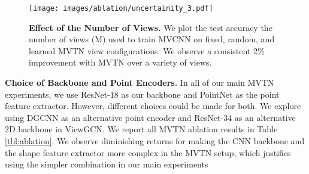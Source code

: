 \documentclass[10pt,twocolumn,letterpaper]{article}
\newcommand{\mysection}[1]{\noindent\textbf{#1.}}
\begin{document}
\begin{figure}[t]
    \centering
    \texttt{[image: images/ablation/uncertainity\_3.pdf]}
    \caption{\textbf{Effect of the Number of Views.} We plot the test accuracy \vs the number of views (M) used to train MVCNN on fixed, random, and learned MVTN view configurations. We observe a consistent 2\% improvement with MVTN over a variety of views.}
    \label{fig:classification}
\end{figure}



\mysection{Choice of Backbone and Point Encoders}
In all of our main MVTN experiments, we use ResNet-18 as our backbone and PointNet as the point feature extractor. However, different choices could be made for both.
We explore using DGCNN \cite{dgcn} as an alternative point encoder and ResNet-34 as an alternative 2D backbone in ViewGCN. We report all MVTN ablation results in Table \ref{tbl:ablation}. We observe diminishing returns for making the CNN backbone and the shape feature extractor more complex in the MVTN setup, which justifies using the simpler combination in our main experiments

\begin{table}[t]
\footnotesize
\setlength{\tabcolsep}{6pt} \renewcommand{\arraystretch}{1.1} \centering
{}
\vspace{2pt}
\caption{\small \textbf{Ablation Study}. We analyze the effect of ablating different MVTN components on test accuracy in ModelNet40. Namely, we observe that using deeper backbone CNNs or a more complex point encoder do not increase the test accuracy.}
\label{tbl:ablation}
\end{table}
\end{document}
